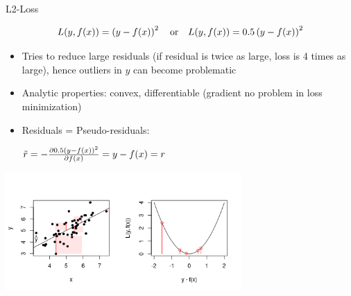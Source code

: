 \begin{vbframe}{L2-Loss}

\vspace*{-0.5cm}

$$
L(y, f(x)) = \left(y-f(x)\right)^2 \quad \text{or} \quad L(y, f(x)) = 0.5 \left(y-f(x)\right)^2
$$

\vspace*{-2mm}

\begin{itemize}
\item Tries to reduce large residuals (if residual is twice as large, loss is 4 times as large), hence outliers in $y$ can become problematic
\item Analytic properties: convex, differentiable (gradient no problem in loss minimization)
\item Residuals = Pseudo-residuals: \begin{footnotesize} $\tilde r = - \frac{\partial{0.5 (y-f(x))^2}}{\partial f(x)} = y - f(x) = r$\end{footnotesize}
\end{itemize}



\vspace*{-6mm}

\begin{center}
  \includegraphics[width = 9cm]{figure_man/loss_quadratic_plot1.png} \\
\end{center}

\end{vbframe}


